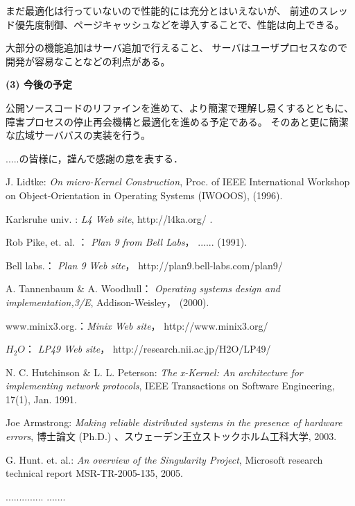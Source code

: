 \documentclass{ipsjpapers}
\begin{document}
まだ最適化は行っていないので性能的には充分とはいえないが、
前述のスレッド優先度制御、ページキャッシュなどを導入することで、性能は向上できる。

大部分の機能追加はサーバ追加で行えること、
サーバはユーザプロセスなので開発が容易なことなどの利点がある。


{\bf (3) 今後の予定}

公開ソースコードのリファインを進めて、より簡潔で理解し易くするとともに、
障害プロセスの停止再会機構と最適化を進める予定である。
そのあと更に簡潔な広域サーババスの実装を行う。


\begin{acknowledgment}
.....の皆様に，謹んで感謝の意を表する．
\end{acknowledgment}


\begin{thebibliography}{10}

J. Lidtke: {\em On micro-Kernel Construction}, 
Proc. of IEEE International Workshop on Object-Orientation in Operating Systems (IWOOOS), (1996). 

Karlsruhe univ. : {\em L4 Web site}, 
http://l4ka.org/ .


Rob Pike, et. al. ： {\em Plan 9 from Bell Labs}， ...... (1991).

Bell labs.： {\em Plan 9 Web site}， 
http://plan9.bell-labs.com/plan9/

A. Tannenbaum \& A. Woodhull： {\em Operating systems design and implementation,3/E}, 
Addison-Weisley， (2000).

www.minix3.org.：{\em Minix  Web site}， 
http://www.minix3.org/

$H_2O$： {\em LP49  Web site}， 
http://research.nii.ac.jp/H2O/LP49/

N. C. Hutchinson \& L. L. Peterson: {\em The x-Kernel: An architecture for implementing network protocols},  IEEE Transactions on Software Engineering, 17(1), Jan. 1991. 

Joe Armstrong: {\em Making reliable distributed systems in the presence of hardware errors}, 博士論文 (Ph.D.) 、スウェーデン王立ストックホルム工科大学, 2003.

G. Hunt. et. al.: {\em An overview of the Singularity Project},
Microsoft research technical report MSR-TR-2005-135, 2005.

\end{thebibliography}


\begin{biography}
..............
%
.......
\end{biography}
\end{document}

